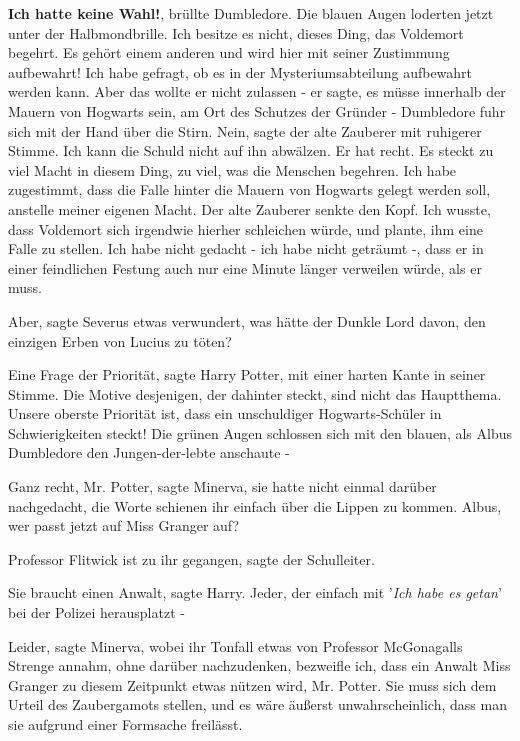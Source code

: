 \glqq{}\textbf{Ich hatte keine Wahl!}\grqq{}, brüllte Dumbledore. Die blauen
Augen loderten jetzt unter der Halbmondbrille. \glqq{}Ich besitze es nicht,
dieses Ding, das Voldemort begehrt. Es gehört einem anderen und wird hier mit
seiner Zustimmung aufbewahrt! Ich habe gefragt, ob es in der Mysteriumsabteilung
aufbewahrt werden kann. Aber das wollte er nicht zulassen - er sagte, es müsse
innerhalb der Mauern von Hogwarts sein, am Ort des Schutzes der Gründer -\grqq{}
Dumbledore fuhr sich mit der Hand über die Stirn. \glqq{}Nein\grqq{}, sagte der
alte Zauberer mit ruhigerer Stimme. \glqq{}Ich kann die Schuld nicht auf ihn
abwälzen. Er hat recht. Es steckt zu viel Macht in diesem Ding, zu viel, was die
Menschen begehren. Ich habe zugestimmt, dass die Falle hinter die Mauern von
Hogwarts gelegt werden soll, anstelle meiner eigenen Macht.\grqq{} Der alte
Zauberer senkte den Kopf. \glqq{}Ich wusste, dass Voldemort sich irgendwie
hierher schleichen würde, und plante, ihm eine Falle zu stellen. Ich habe nicht
gedacht - ich habe nicht geträumt -, dass er in einer feindlichen Festung auch
nur eine Minute länger verweilen würde, als er muss.\grqq{}

\glqq{}Aber\grqq{}, sagte Severus etwas verwundert, \glqq{}was hätte der Dunkle
Lord davon, den einzigen Erben von Lucius zu töten?\grqq{}

\glqq{}Eine Frage der Priorität\grqq{}, sagte Harry Potter, mit einer harten
Kante in seiner Stimme. \glqq{}Die Motive desjenigen, der dahinter steckt, sind
nicht das Hauptthema. Unsere oberste Priorität ist, dass ein unschuldiger
Hogwarts-Schüler in Schwierigkeiten steckt!\grqq{} Die grünen Augen schlossen
sich mit den blauen, als Albus Dumbledore den Jungen-der-lebte anschaute -

\glqq{}Ganz recht, Mr. Potter\grqq{}, sagte Minerva, sie hatte nicht einmal
darüber nachgedacht, die Worte schienen ihr einfach über die Lippen zu kommen.
\glqq{}Albus, wer passt jetzt auf Miss Granger auf?\grqq{}

\glqq{}Professor Flitwick ist zu ihr gegangen\grqq{}, sagte der Schulleiter.

\glqq{}Sie braucht einen Anwalt\grqq{}, sagte Harry. \glqq{}Jeder, der einfach mit
'\emph{Ich habe es getan}' bei der Polizei herausplatzt -\grqq{}

\glqq{}Leider\grqq{}, sagte Minerva, wobei ihr Tonfall etwas von Professor
McGonagalls Strenge annahm, ohne darüber nachzudenken, \glqq{}bezweifle ich, dass
ein Anwalt Miss Granger zu diesem Zeitpunkt etwas nützen wird, Mr. Potter. Sie
muss sich dem Urteil des Zaubergamots stellen, und es wäre äußerst
unwahrscheinlich, dass man sie aufgrund einer Formsache freilässt.\grqq{}

